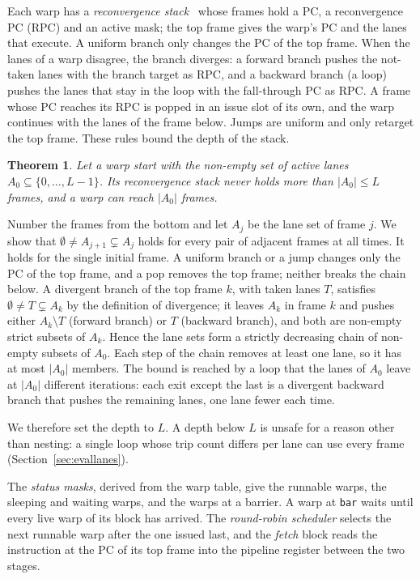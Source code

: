 \documentclass[journal]{IEEEtran}
\newtheorem{theorem}{Theorem}
\begin{document}
Each warp has a \emph{reconvergence stack}~\cite{fung,aamodt} whose frames hold a
PC, a reconvergence PC (RPC) and an active mask; the top frame gives the warp's PC
and the lanes that execute. A uniform branch only changes the PC of the top frame.
When the lanes of a warp disagree, the branch diverges: a forward branch pushes
the not-taken lanes with the branch target as RPC, and a backward branch (a loop)
pushes the lanes that stay in the loop with the fall-through PC as RPC. A frame
whose PC reaches its RPC is popped in an issue slot of its own, and the warp
continues with the lanes of the frame below. Jumps are uniform and only retarget the
top frame. These rules bound the depth of the stack.

\begin{theorem}\label{thm:stack}
Let a warp start with the non-empty set of active lanes $A_0\subseteq\{0,\dots,L-1\}$.
Its reconvergence stack never holds more than $|A_0|\le L$ frames, and a warp can
reach $|A_0|$ frames.
\end{theorem}
\begin{IEEEproof}
Number the frames from the bottom and let $A_j$ be the lane set of frame $j$. We show
that $\emptyset\neq A_{j+1}\subsetneq A_j$ holds for every pair of adjacent frames at
all times. It holds for the single initial frame. A uniform branch or a jump changes
only the PC of the top frame, and a pop removes the top frame; neither breaks the
chain below. A divergent branch of the top frame $k$, with taken lanes $T$, satisfies
$\emptyset\neq T\subsetneq A_k$ by the definition of divergence; it leaves $A_k$ in
frame $k$ and pushes either $A_k\setminus T$ (forward branch) or $T$ (backward
branch), and both are non-empty strict subsets of $A_k$. Hence the lane sets form a
strictly decreasing chain of non-empty subsets of $A_0$. Each step of the chain
removes at least one lane, so it has at most $|A_0|$ members. The bound is reached by
a loop that the lanes of $A_0$ leave at $|A_0|$ different iterations: each exit except
the last is a divergent backward branch that pushes the remaining lanes, one lane
fewer each time.
\end{IEEEproof}

We therefore set the depth to $L$. A depth below $L$ is unsafe for a reason other
than nesting: a single loop whose trip count differs per lane can use every frame
(Section~\ref{sec:evallanes}).

The \emph{status masks}, derived from the warp table, give the runnable warps, the
sleeping and waiting warps, and the warps at a barrier. A warp at \texttt{bar} waits until every
live warp of its block has arrived. The \emph{round-robin scheduler} selects the
next runnable warp after the one issued last, and the \emph{fetch} block reads the
instruction at the PC of its top frame into the pipeline register between the two
stages.
\end{document}
